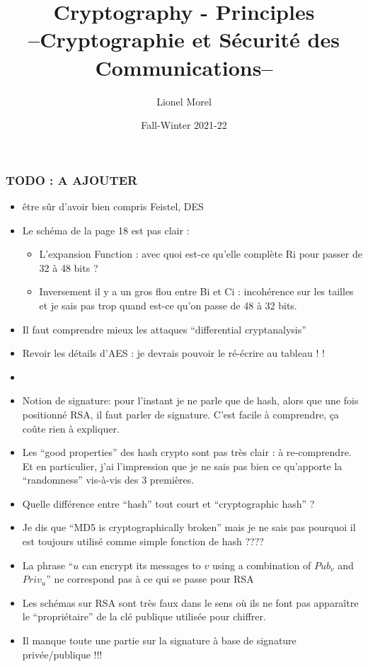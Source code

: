 \documentclass[
hyperref={pdfpagelabels=false}
,xcolor=table
]
{beamer}
\title[CSC - Intro]{Cryptography - Principles \\ --Cryptographie et Sécurité des Communications--}
\author[]{Lionel Morel}
\institute[]{Telecommunications - INSA Lyon}
\date{Fall-Winter 2021-22}
\begin{document}
\begin{frame}
  \maketitle
\end{frame}


\begin{frame}
  \frametitle{TODO : A AJOUTER}

  \begin{itemize}
  \item être sûr d'avoir bien compris Feistel, DES
  \item Le schéma de la page 18 est pas clair :
    \begin{itemize}
    \item L'expansion Function : avec quoi est-ce qu'elle complète Ri pour passer de 32 à 48 bits ? 
    \item Inversement il y a un gros flou entre Bi et Ci : incohérence sur les tailles et je sais pas trop quand est-ce qu'on passe de 48 à 32 bits. 
    \end{itemize}
  \item Il faut comprendre mieux les attaques ``differential cryptanalysis'' 
  \item Revoir les détails d'AES : je devrais pouvoir le ré-écrire au tableau ! ! 
  \item
  \item Notion de signature: pour l'instant je ne parle que de hash, alors que une fois positionné RSA, il faut parler de signature. C'est facile à comprendre, ça coûte rien à expliquer. 
  \item Les ``good properties'' des hash crypto sont pas très clair : à re-comprendre. Et en particulier, j'ai l'impression que je ne sais pas bien ce qu'apporte la ``randomness'' vis-à-vis des 3 premières. 
  \item Quelle différence entre ``hash'' tout court et ``cryptographic hash'' ? 
  \item Je dis que ``MD5 is cryptographically broken'' mais je ne sais pas pourquoi il est toujours utilisé comme simple fonction de hash ???? 
  \item La phrase ``$u$ can encrypt its messages to $v$ using a combination of $Pub_v$ and $Priv_u$'' ne correspond pas à ce qui se passe pour RSA
  \item Les schémas sur RSA sont très faux dans le sens où ils ne font pas apparaître le ``propriétaire'' de la clé publique utilisée pour chiffrer. 
  \item Il manque toute une partie sur la signature à base de signature privée/publique !!! 
  \end{itemize}
\end{frame}
\end{document}
